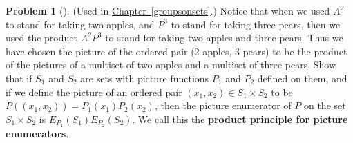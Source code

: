\documentclass[10pt,]{book}
\newcommand{\terminology}[1]{\textbf{#1}}
\theoremstyle{plain}
\theoremstyle{definition}
\newtheorem{activity}[project]{Problem}
\theoremstyle{definition}
\numberwithin{equation}{chapter}
\begin{document}
\begin{activity}[] \label{activity-182}
\hypertarget{p-1060}{}%
(Used in \hyperref[groupsonsets]{Chapter~\ref{groupsonsets}}.) Notice that when we used \(A^2\) to stand for taking two apples, and \(P^3\) to stand for taking three pears, then we used the product \(A^2P^3\) to stand for taking two apples and three pears. Thus we have chosen the picture of the ordered pair (2 apples, 3 pears) to be the product of the pictures of a multiset of two apples and a multiset of three pears. Show that if \(S_1\) and \(S_2\) are sets with picture functions \(P_1\) and \(P_2\) defined on them, and if we define the picture of an ordered pair \((x_1,x_2)\in S_1\times S_2\) to be \(P((x_1,x_2))= P_1(x_1)P_2(x_2)\), then the picture enumerator of \(P\) on the set \(S_1\times S_2\) is \(E_{P_1}(S_1)E_{P_2}(S_2)\). We call this the \terminology{product principle for picture enumerators}.%
\end{activity}
\typeout{************************************************}
\typeout{************************************************}
\end{document}
